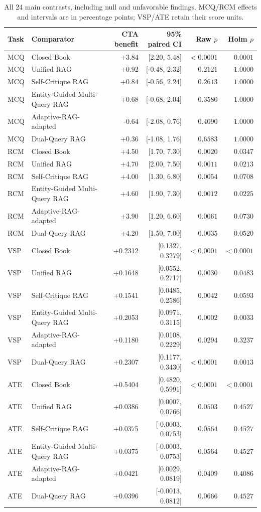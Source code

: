 \begin{table}[t]
\centering
\scriptsize
\caption{All 24 main contrasts, including null and unfavorable findings. MCQ/RCM effects and intervals are in percentage points; VSP/ATE retain their score units.}
\label{tab:all-paired-tests}
\setlength{\tabcolsep}{5pt}
\begin{tabular}{@{}llrrrr@{}}
\toprule
Task & Comparator & CTA benefit & 95\% paired CI & Raw $p$ & Holm $p$ \\
\midrule
MCQ & Closed Book & +3.84 & [2.20, 5.48] & $<0.0001$ & $0.0001$ \\
MCQ & Unified RAG & +0.92 & [-0.48, 2.32] & $0.2121$ & $1.0000$ \\
MCQ & Self-Critique RAG & +0.84 & [-0.56, 2.24] & $0.2613$ & $1.0000$ \\
MCQ & Entity-Guided Multi-Query RAG & +0.68 & [-0.68, 2.04] & $0.3580$ & $1.0000$ \\
MCQ & Adaptive-RAG-adapted & -0.64 & [-2.08, 0.76] & $0.4090$ & $1.0000$ \\
MCQ & Dual-Query RAG & +0.36 & [-1.08, 1.76] & $0.6583$ & $1.0000$ \\
RCM & Closed Book & +4.50 & [1.70, 7.30] & $0.0020$ & $0.0347$ \\
RCM & Unified RAG & +4.70 & [2.00, 7.50] & $0.0011$ & $0.0213$ \\
RCM & Self-Critique RAG & +4.00 & [1.30, 6.80] & $0.0054$ & $0.0708$ \\
RCM & Entity-Guided Multi-Query RAG & +4.60 & [1.90, 7.30] & $0.0012$ & $0.0225$ \\
RCM & Adaptive-RAG-adapted & +3.90 & [1.20, 6.60] & $0.0061$ & $0.0730$ \\
RCM & Dual-Query RAG & +4.20 & [1.50, 7.00] & $0.0035$ & $0.0520$ \\
VSP & Closed Book & +0.2312 & [0.1327, 0.3279] & $<0.0001$ & $<0.0001$ \\
VSP & Unified RAG & +0.1648 & [0.0552, 0.2717] & $0.0030$ & $0.0483$ \\
VSP & Self-Critique RAG & +0.1541 & [0.0485, 0.2586] & $0.0042$ & $0.0593$ \\
VSP & Entity-Guided Multi-Query RAG & +0.2053 & [0.0971, 0.3115] & $0.0002$ & $0.0033$ \\
VSP & Adaptive-RAG-adapted & +0.1180 & [0.0108, 0.2229] & $0.0294$ & $0.3237$ \\
VSP & Dual-Query RAG & +0.2307 & [0.1177, 0.3430] & $<0.0001$ & $0.0013$ \\
ATE & Closed Book & +0.5404 & [0.4820, 0.5991] & $<0.0001$ & $<0.0001$ \\
ATE & Unified RAG & +0.0386 & [0.0007, 0.0766] & $0.0503$ & $0.4527$ \\
ATE & Self-Critique RAG & +0.0375 & [-0.0003, 0.0753] & $0.0564$ & $0.4527$ \\
ATE & Entity-Guided Multi-Query RAG & +0.0375 & [-0.0003, 0.0753] & $0.0564$ & $0.4527$ \\
ATE & Adaptive-RAG-adapted & +0.0421 & [0.0029, 0.0819] & $0.0409$ & $0.4086$ \\
ATE & Dual-Query RAG & +0.0396 & [-0.0013, 0.0812] & $0.0666$ & $0.4527$ \\
\bottomrule
\end{tabular}


\end{table}

